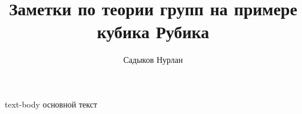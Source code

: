 \documentclass{tufte-book}
\title{Заметки по теории групп {\Huge на примере кубика Рубика}} %
\author{Садыков Нурлан}
\begin{document}
\frontmatter

\maketitle  

text-body
основной текст
\end{document}
